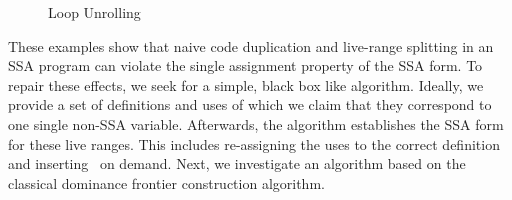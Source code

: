 \begin{figure}[htbp]
	\begin{center}
		\hfill
		\hfill
	\end{center}
	\caption{Loop Unrolling}
	\label{fig:unroll}
\end{figure}

These examples show that naive code duplication and live-range splitting in an SSA program can violate the single assignment property of the SSA form.
To repair these effects, we seek for a simple, black box like algorithm.
Ideally, we provide a set of definitions and uses of which we claim that they correspond to one single non-SSA variable.
Afterwards, the algorithm establishes the SSA form for these live ranges.
This includes re-assigning the uses to the correct definition and inserting \phiops\ on demand.
Next, we investigate an algorithm based on the classical dominance frontier construction algorithm.

